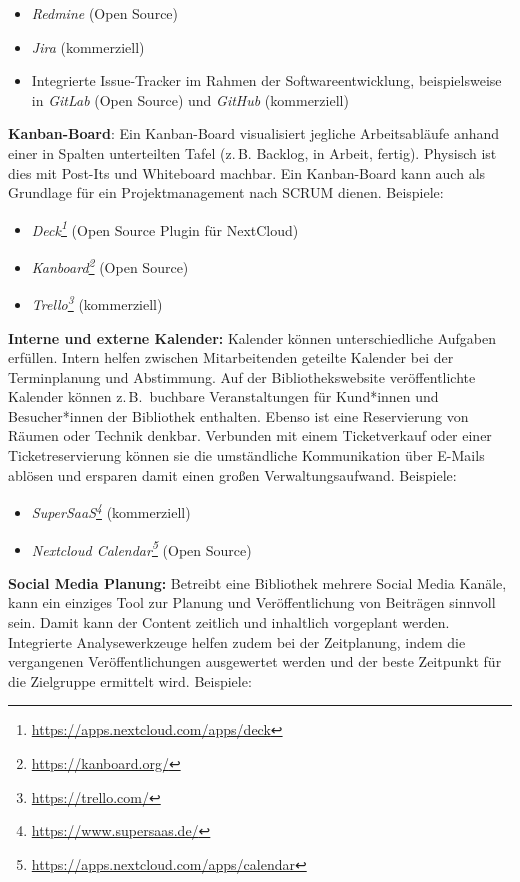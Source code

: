 \documentclass[
  11pt,
  letterpaper,
  DIV=11,
  twoside]{scrreprt}
\providecommand{\tightlist}{%
  \setlength{\itemsep}{0pt}\setlength{\parskip}{0pt}}\usepackage{longtable,booktabs,array}
\DeclareRobustCommand{\href}[2]{#2\footnote{\url{#1}}}
\begin{document}
\begin{itemize}
\tightlist
\item
  \emph{Redmine} (Open Source)
\item
  \emph{Jira} (kommerziell)
\item
  Integrierte Issue-Tracker im Rahmen der Softwareentwicklung,
  beispielsweise in \emph{GitLab} (Open Source) und \emph{GitHub}
  (kommerziell)
\end{itemize}

\textbf{Kanban-Board}: Ein Kanban-Board visualisiert jegliche
Arbeitsabläufe anhand einer in Spalten unterteilten Tafel (z.\,B.
Backlog, in Arbeit, fertig). Physisch ist dies mit Post-Its und
Whiteboard machbar. Ein Kanban-Board kann auch als Grundlage für ein
Projektmanagement nach SCRUM dienen. Beispiele:

\begin{itemize}
\tightlist
\item
  \emph{\href{https://apps.nextcloud.com/apps/deck}{Deck}} (Open Source
  Plugin für NextCloud)
\item
  \emph{\href{https://kanboard.org/}{Kanboard}} (Open Source)
\item
  \emph{\href{https://trello.com/}{Trello}} (kommerziell)
\end{itemize}

\textbf{Interne und externe Kalender:} Kalender können unterschiedliche
Aufgaben erfüllen. Intern helfen zwischen Mitarbeitenden geteilte
Kalender bei der Terminplanung und Abstimmung. Auf der
Bibliothekswebsite veröffentlichte Kalender können z.\,B.~buchbare
Veranstaltungen für Kund*innen und Besucher*innen der Bibliothek
enthalten. Ebenso ist eine Reservierung von Räumen oder Technik denkbar.
Verbunden mit einem Ticketverkauf oder einer Ticketreservierung können
sie die umständliche Kommunikation über E-Mails ablösen und ersparen
damit einen großen Verwaltungsaufwand. Beispiele:

\begin{itemize}
\tightlist
\item
  \emph{\href{https://www.supersaas.de/}{SuperSaaS}} (kommerziell)
\item
  \emph{\href{https://apps.nextcloud.com/apps/calendar}{Nextcloud
  Calendar}} (Open Source)
\end{itemize}

\textbf{Social Media Planung:} Betreibt eine Bibliothek mehrere Social
Media Kanäle, kann ein einziges Tool zur Planung und Veröffentlichung
von Beiträgen sinnvoll sein. Damit kann der Content zeitlich und
inhaltlich vorgeplant werden. Integrierte Analysewerkzeuge helfen zudem
bei der Zeitplanung, indem die vergangenen Veröffentlichungen
ausgewertet werden und der beste Zeitpunkt für die Zielgruppe ermittelt
wird. Beispiele:
\end{document}
